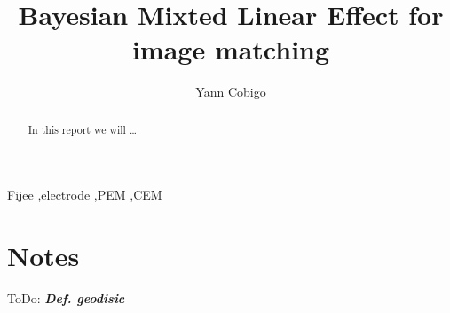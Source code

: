 \documentclass[final, paper=letter,5p,times,twocolumn]{elsarticle}
\newcommand{\ToDo}[1]{ToDo: \textbf{\textit{#1}}}
\theoremstyle{definition}
\begin{document}
\begin{frontmatter}

\title{Bayesian Mixted Linear Effect for image matching}

\author[label1]{Yann Cobigo}
\address[label1]{University of California, San Francisco | ucsf.edu}




\begin{abstract}
In this report we will \dots
\end{abstract}

\begin{keyword}
Fijee \sep electrode \sep PEM \sep CEM
\end{keyword}

\end{frontmatter}


\section{Notes}

\ToDo{Def. geodisic} \\



\end{document}
